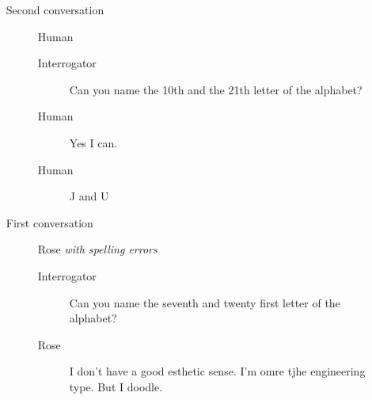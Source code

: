 \begin{itemize}
\begin{description}
\begin{description}
            \end{description}
         \item [Second conversation] Human
            \begin{description}
               \item [Interrogator] Can you name the 10th and the 21th letter of the alphabet?
               \item [Human] Yes I can.
               \item [Human] J and U
            \end{description}
         \item [First conversation] Rose \textit{with spelling errors}
            \begin{description}
               \item [Interrogator] Can you name the seventh and twenty first letter of the alphabet?
               \item [Rose] I don't have a good esthetic sense. I'm omre tjhe engineering type. But I doodle.
            \end{description}
      \end{description}


\end{itemize}

